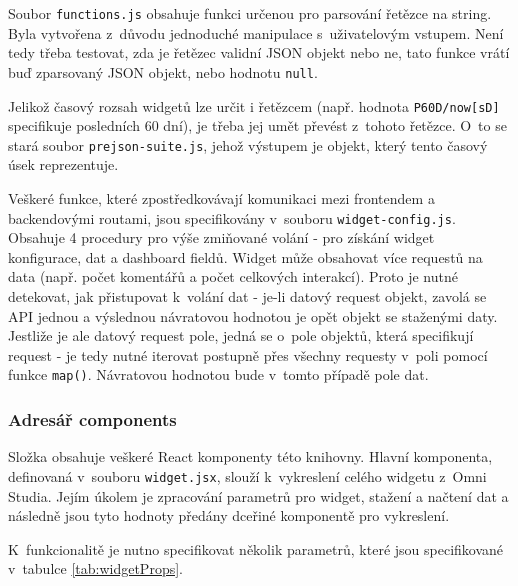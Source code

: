 \documentclass[czech, bc, kiv, he, iso690numb, viewonly]{fasthesis} %
\begin{document}
Soubor \texttt{functions.js} obsahuje funkci určenou pro parsování řetězce na string. Byla vytvořena z~důvodu jednoduché manipulace s~uživatelovým vstupem. Není tedy třeba
testovat, zda je řetězec validní JSON objekt nebo ne, tato funkce vrátí buď zparsovaný JSON objekt, nebo hodnotu \texttt{null}.

Jelikož časový rozsah widgetů lze určit i řetězcem (např. hodnota \texttt{P60D/now[sD]} specifikuje posledních 60 dní), je třeba jej umět převést z~tohoto řetězce. O~to se stará soubor
\texttt{prejson-suite.js}, jehož výstupem je objekt, který tento časový úsek reprezentuje.

Veškeré funkce, které zpostředkovávají komunikaci mezi frontendem a backendovými routami, jsou specifikovány v~souboru \texttt{widget-config.js}. Obsahuje 4 procedury pro výše zmiňované
volání - pro získání widget konfigurace, dat a dashboard fieldů. Widget může obsahovat více requestů na data (např. počet komentářů a počet celkových interakcí). Proto je nutné detekovat,
jak přistupovat k~volání dat - je-li datový request objekt, zavolá se API jednou a výslednou návratovou hodnotou je opět objekt se staženými daty. Jestliže je ale datový request pole, jedná se o~pole objektů, která specifikují request - je tedy
nutné iterovat postupně přes všechny requesty v~poli pomocí funkce \texttt{map()}. Návratovou hodnotou bude v~tomto případě pole dat.

\subsubsection{Adresář components}

Složka obsahuje veškeré React komponenty této knihovny. Hlavní komponenta, definovaná v~souboru \texttt{widget.jsx}, slouží k~vykreslení celého widgetu z~Omni Studia. Jejím úkolem
je zpracování parametrů pro widget, stažení a načtení dat a následně jsou tyto hodnoty předány dceřiné komponentě pro vykreslení.

K~funkcionalitě je nutno specifikovat několik parametrů, které jsou specifikované v~tabulce \ref{tab:widgetProps}.
\end{document}
